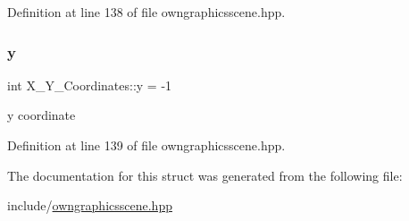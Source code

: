Definition at line 138 of file owngraphicsscene.\+hpp.

\mbox{\label{structX__Y__Coordinates_a4a608b81d10b65d5b12596ca82df34f6}} 
\subsubsection{\texorpdfstring{y}{y}}
{\footnotesize\ttfamily int X\+\_\+\+Y\+\_\+\+Coordinates\+::y = -\/1}

y coordinate 

Definition at line 139 of file owngraphicsscene.\+hpp.



The documentation for this struct was generated from the following file\+:\begin{DoxyCompactItemize}
\item 
include/\mbox{\hyperlink{owngraphicsscene_8hpp}{owngraphicsscene.\+hpp}}\end{DoxyCompactItemize}

